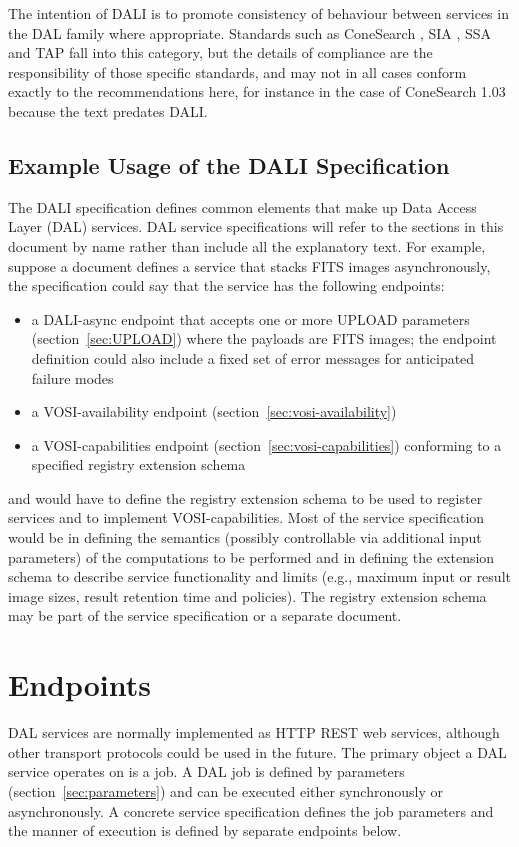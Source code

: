 \documentclass[11pt,letter]{ivoa}
\begin{document}
The intention of DALI is to promote consistency of behaviour
between services in the DAL family where appropriate.
Standards such as
ConeSearch \citep{2008ivoa.specQ0222P},
SIA \citep{2015ivoa.spec.1223D},
SSA \citep{2012ivoa.spec.0210T} and
TAP \citep{2019ivoa.spec.0927D}
fall into this category,
but the details of compliance are the responsibility of those
specific standards, and may not in all cases conform exactly
to the recommendations here, for instance in the case of ConeSearch 1.03
because the text predates DALI.

\subsection{Example Usage of the DALI Specification}
The DALI specification defines common elements that make up Data Access Layer
(DAL) services. DAL service specifications will refer to the sections in this
document by name rather than include all the explanatory text. For example,
suppose a document defines a service that stacks FITS images asynchronously, the
specification could say that the service has the following endpoints:


\begin{itemize}
\item a DALI-async endpoint that accepts one or more UPLOAD parameters
(section~\ref{sec:UPLOAD}) where the payloads are FITS images; the
endpoint definition
could also include a fixed set of error messages for anticipated failure modes

\item a VOSI-availability endpoint (section~\ref{sec:vosi-availability})

\item a VOSI-capabilities endpoint (section~\ref{sec:vosi-capabilities}) conforming
to a specified registry extension schema
\end{itemize}

\noindent
and would have to define the registry extension schema to be used to register
services and to implement VOSI-capabilities. Most of the service
specification would be in defining the semantics (possibly controllable via
additional input parameters) of the computations to be performed and in defining
the extension schema to describe service functionality and limits (e.g., maximum
input or result image sizes, result retention time and policies). The registry
extension schema may be part of the service specification or a separate
document.

\section{Endpoints}
\label{sec:endpoints}
DAL services are normally implemented as HTTP REST \citep{fielding00}
web services, although
other transport protocols could be used in the future. The primary object
a DAL service operates on is a job. A DAL job is defined by parameters
(section~\ref{sec:parameters}) and
can be executed either synchronously or asynchronously. A concrete service
specification defines the job parameters and the manner of execution is defined
by separate endpoints below.
\end{document}

